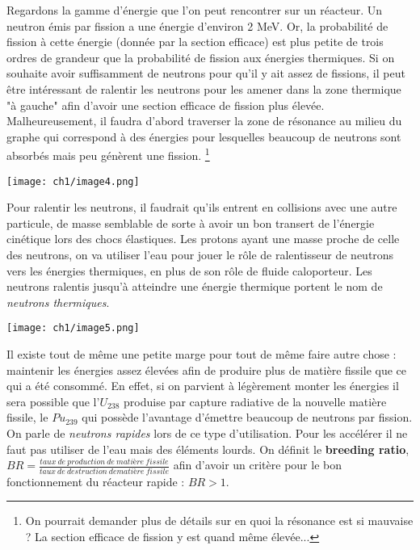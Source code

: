 Regardons la gamme d'énergie que l'on peut rencontrer sur un réacteur. Un neutron émis par 
fission a une énergie d'environ 2 MeV. Or, la probabilité de fission à cette énergie (donnée par
la section efficace) est plus petite de trois ordres de grandeur que la probabilité de fission
aux énergies thermiques. Si on souhaite avoir suffisamment de neutrons pour qu'il y ait assez de fissions,
 il peut être intéressant de ralentir les neutrons pour les amener dans la zone 
thermique "à gauche" afin d'avoir une section efficace de fission plus élevée.
Malheureusement, il faudra d'abord traverser la zone de résonance au milieu du graphe qui correspond
à des énergies pour lesquelles beaucoup de neutrons sont absorbés mais peu génèrent une fission.
\footnote{On pourrait demander plus de détails sur en quoi la résonance est si mauvaise ? La section
efficace de fission y est quand même élevée...}

\begin{center}
	\texttt{[image: ch1/image4.png]}
\end{center}


Pour ralentir les neutrons, il faudrait qu'ils entrent en collisions avec une autre particule, de masse semblable de sorte à avoir
un bon transert de l'énergie cinétique lors des chocs élastiques. Les protons ayant une masse proche de celle des neutrons,
on va utiliser l'eau pour jouer le rôle de ralentisseur de neutrons vers les énergies thermiques, en plus de son rôle de fluide
caloporteur. Les neutrons ralentis jusqu'à atteindre une énergie thermique portent le nom de  \textit{neutrons thermiques}.
\newpage

\begin{center}
	\texttt{[image: ch1/image5.png]}
\end{center}

Il existe tout de même une petite marge pour tout de même faire autre chose : maintenir les énergies 
assez élevées afin de produire plus de matière fissile que ce qui a été consommé. En effet, si on 
parvient à légèrement monter les énergies il sera possible que l'$U_{238}$ produise par capture radiative
de la nouvelle matière fissile, le $Pu_{239}$ qui possède l'avantage d'émettre beaucoup de neutrons par fission.
On parle de \textit{neutrons rapides} lors de ce type d'utilisation.
Pour les accélérer il ne faut pas utiliser de l'eau mais des éléments lourds.
On définit le \textbf{breeding ratio}, $BR = \frac{taux\ de\ production\ de\ matière\ fissile}{taux\ de\ destruction\ de
matière\ fissile}$ afin d'avoir un critère pour le bon fonctionnement du réacteur rapide : $BR > 1$.



